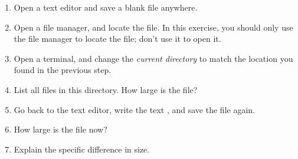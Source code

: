 \begin{enumerate}
  \item Open a text editor and save a blank file anywhere.
  \item Open a file manager, and locate the file. In this exercise, you should only use the file manager to locate the file; don't use it to open it.
  \item Open a terminal, and change the \textsl{current directory} to match the location you found in the previous step.
  \item List all files in this directory. How large is the file?
  \item Go back to the text editor, write the text , and save the file again.
  \item How large is the file now?
  \item Explain the specific difference in size.
\end{enumerate}
